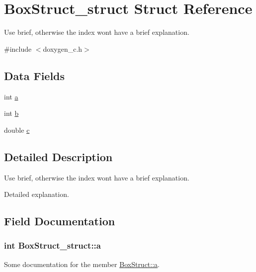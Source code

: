 \hypertarget{struct_box_struct__struct}{}\section{Box\+Struct\+\_\+struct Struct Reference}
\label{struct_box_struct__struct}


Use brief, otherwise the index won\textquotesingle{}t have a brief explanation.  




{\ttfamily \#include $<$doxygen\+\_\+c.\+h$>$}

\subsection*{Data Fields}
\begin{DoxyCompactItemize}
\item 
int \hyperlink{struct_box_struct__struct_a4593938c5e90f024e7971bdb1392d9d6}{a}
\item 
int \hyperlink{struct_box_struct__struct_aee44748dc579c5d794853ee8b133d197}{b}
\item 
double \hyperlink{struct_box_struct__struct_a4543370ed67b2cf5ae3f55201bea11e6}{c}
\end{DoxyCompactItemize}


\subsection{Detailed Description}
Use brief, otherwise the index won\textquotesingle{}t have a brief explanation. 

Detailed explanation. 

\subsection{Field Documentation}
\hypertarget{struct_box_struct__struct_a4593938c5e90f024e7971bdb1392d9d6}{}
\subsubsection[{a}]{\setlength{\rightskip}{0pt plus 5cm}int Box\+Struct\+\_\+struct\+::a}\label{struct_box_struct__struct_a4593938c5e90f024e7971bdb1392d9d6}
Some documentation for the member \hyperlink{struct_box_struct__struct_a4593938c5e90f024e7971bdb1392d9d6}{Box\+Struct\+::a}. \hypertarget{struct_box_struct__struct_aee44748dc579c5d794853ee8b133d197}{}

